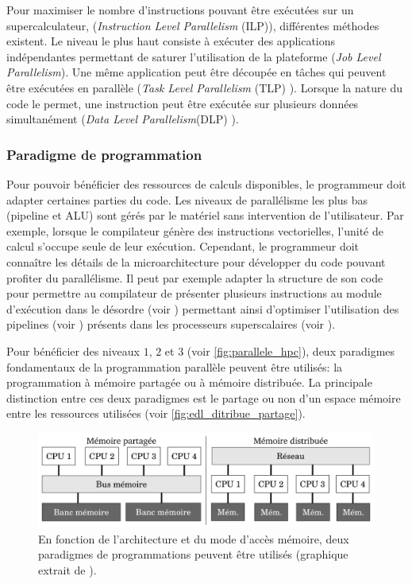             Pour maximiser le nombre d'instructions pouvant être exécutées sur un supercalculateur, (\textit{Instruction Level Parallelism} (ILP)), différentes méthodes existent. Le niveau le plus haut consiste à exécuter des applications indépendantes permettant de saturer l'utilisation de la plateforme (\textit{Job Level Parallelism}). Une même application peut être découpée en tâches qui peuvent être exécutées en parallèle (\textit{Task Level Parallelism} (TLP) \cite{Kambadur2009}). Lorsque la nature du code le permet, une instruction peut être exécutée sur plusieurs données simultanément (\textit{Data Level Parallelism}(DLP) \cite{Espasa1997}).

    \subsubsection{Paradigme de programmation}
       
        Pour pouvoir bénéficier des ressources de calculs disponibles, le programmeur doit adapter certaines parties du code. Les niveaux de parallélisme les plus bas (pipeline et ALU) sont gérés par le matériel sans intervention de l'utilisateur. Par exemple, lorsque le compilateur génère des instructions vectorielles, l'unité de calcul s'occupe seule de leur exécution. Cependant, le programmeur doit connaître les détails de la microarchitecture pour développer du code pouvant profiter du parallélisme.  Il peut par exemple adapter la structure de son code pour permettre au compilateur de présenter plusieurs instructions au module d'exécution dans le désordre (voir ) permettant ainsi d'optimiser l'utilisation des pipelines (voir ) présents dans les processeurs superscalaires (voir ).
        
        Pour bénéficier des niveaux $1$, $2$ et $3$ (voir \autoref{fig:parallele_hpc}), deux paradigmes fondamentaux de la programmation parallèle peuvent être utilisés: la programmation à mémoire partagée ou à mémoire distribuée. La principale distinction entre ces deux paradigmes est le partage ou non d'un espace mémoire entre les ressources utilisées (voir \autoref{fig:edl_ditribue_partage}). 
        
            \begin{figure}
                \center
                \includegraphics[width=14cm]{images/edl_ditribue_partage.png}
                \caption{\label{fig:edl_ditribue_partage} En fonction de l'architecture et du mode d'accès mémoire, deux paradigmes de programmations peuvent être utilisés (graphique extrait de \cite{Valat2016}).}
            \end{figure}
        

